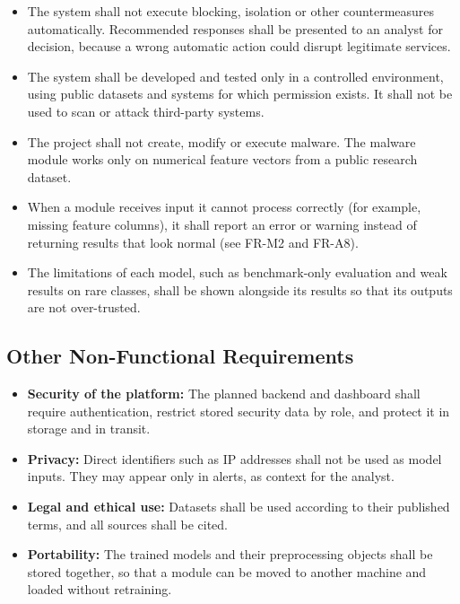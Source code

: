\begin{itemize}
   \setlength{\itemsep}{1pt}
   \setlength{\parskip}{0pt}
   \setlength{\parsep}{0pt}
   \item The system shall not execute blocking, isolation or other countermeasures automatically. Recommended responses shall be presented to an analyst for decision, because a wrong automatic action could disrupt legitimate services.
   \item The system shall be developed and tested only in a controlled environment, using public datasets and systems for which permission exists. It shall not be used to scan or attack third-party systems.
   \item The project shall not create, modify or execute malware. The malware module works only on numerical feature vectors from a public research dataset.
   \item When a module receives input it cannot process correctly (for example, missing feature columns), it shall report an error or warning instead of returning results that look normal (see FR-M2 and FR-A8).
   \item The limitations of each model, such as benchmark-only evaluation and weak results on rare classes, shall be shown alongside its results so that its outputs are not over-trusted.
\end{itemize}

\subsection{Other Non-Functional Requirements}

\begin{itemize}
   \setlength{\itemsep}{1pt}
   \setlength{\parskip}{0pt}
   \setlength{\parsep}{0pt}
   \item \textbf{Security of the platform:} The planned backend and dashboard shall require authentication, restrict stored security data by role, and protect it in storage and in transit.
   \item \textbf{Privacy:} Direct identifiers such as IP addresses shall not be used as model inputs. They may appear only in alerts, as context for the analyst.
   \item \textbf{Legal and ethical use:} Datasets shall be used according to their published terms, and all sources shall be cited.
   \item \textbf{Portability:} The trained models and their preprocessing objects shall be stored together, so that a module can be moved to another machine and loaded without retraining.
\end{itemize}
